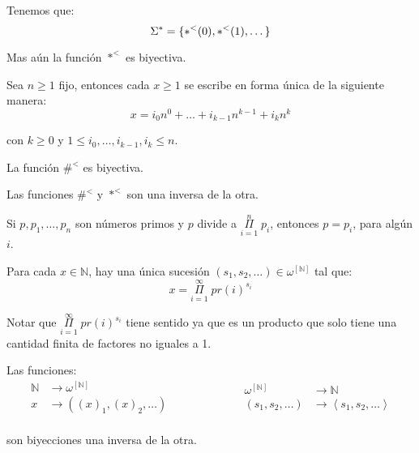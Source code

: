   \begin{lemma}
    \PN Tenemos que:
    \[
      \Sigma^{\ast} = \{\ast^{<}(0), \ast^{<}(1), \dotsc\}
    \]

    \PN Mas aún la función $\ast^{<}$ es biyectiva.
  \end{lemma}

  \begin{lemma}
    \PN Sea $n \geq 1$ fijo, entonces cada $x \geq 1$ se escribe en forma única de la siguiente manera:
    \[
      x = i_{0} n^{0} + \dotsc + i_{k-1} n^{k-1} + i_{k} n^{k}
    \]

    \PN con $k\geq 0$ y $1 \leq i_{0}, \dotsc, i_{k-1}, i_{k} \leq n$.
  \end{lemma}

  \begin{lemma}
    \PN La función $\#^{<}$ es biyectiva.
  \end{lemma}

  \begin{lemma}
    \PN Las funciones $\#^{<}$ y $\ast^{<}$ son una inversa de la otra.
  \end{lemma}

  \begin{lemma}
    \PN Si $p, p_{1}, \dotsc, p_{n}$ son números primos y $p$ divide a $\underset{i=1}{\overset{n}{\Pi}} \; p_{i}$,
    entonces $p = p_{i}$, para algún $i$.
  \end{lemma}

  \begin{theorem}
    \PN Para cada $x \in \mathbb{N}$, hay una única sucesión $(s_{1}, s_{2}, \dotsc) \in
    \omega^{\left[\mathbb{N}\right]}$ tal que:
    \[
      x = \underset{i=1}{\overset{\infty}{\Pi}} \; pr(i)^{s_{i}}
    \]

    \PN Notar que $\underset{i=1}{\overset{\infty}{\Pi}} \; pr(i)^{s_{i}}$ tiene sentido ya que es un producto que solo
    tiene una cantidad finita de factores no iguales a 1.
  \end{theorem}

  \begin{lemma}
    \PN Las funciones:
    \begin{equation*}
      \begin{aligned}
        \mathbb{N} &\rightarrow \omega^{\left[\mathbb{N}\right]} \\
      	x &\rightarrow ((x)_{1}, (x)_{2}, \dotsc) \\
      \end{aligned}
      \qquad\qquad\qquad
      \begin{aligned}
        \omega^{\left[\mathbb{N}\right]} &\rightarrow \mathbb{N} \\
        (s_{1}, s_{2}, \dotsc) &\rightarrow \left\langle s_{1}, s_{2}, \dotsc \right\rangle \\
      \end{aligned}
    \end{equation*}

    \PN son biyecciones una inversa de la otra.
  \end{lemma}

